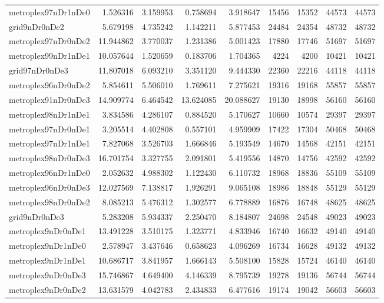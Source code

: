 \begin{longtable}{|l|r|r|r|r|r|r|r|r|}
metroplex97nDr1nDe0 & 1.526316 & 3.159953 & 0.758694 & 3.918647 & 15456 & 15352 & 44573 & 44573 \\
grid9nDr0nDe2 & 5.679198 & 4.735242 & 1.142211 & 5.877453 & 24484 & 24354 & 48732 & 48732 \\
metroplex97nDr0nDe2 & 11.944862 & 3.770037 & 1.231386 & 5.001423 & 17880 & 17746 & 51697 & 51697 \\
metroplex99nDr1nDe1 & 10.057644 & 1.520659 & 0.183706 & 1.704365 & 4224 & 4200 & 10421 & 10421 \\
grid97nDr0nDe3 & 11.807018 & 6.093210 & 3.351120 & 9.444330 & 22360 & 22216 & 44118 & 44118 \\
metroplex96nDr0nDe2 & 5.854611 & 5.506010 & 1.769611 & 7.275621 & 19316 & 19168 & 55857 & 55857 \\
metroplex91nDr0nDe3 & 14.909774 & 6.464542 & 13.624085 & 20.088627 & 19130 & 18998 & 56160 & 56160 \\
metroplex98nDr1nDe1 & 3.834586 & 4.286107 & 0.884520 & 5.170627 & 10660 & 10574 & 29397 & 29397 \\
metroplex97nDr0nDe1 & 3.205514 & 4.402808 & 0.557101 & 4.959909 & 17422 & 17304 & 50468 & 50468 \\
metroplex97nDr1nDe1 & 7.827068 & 3.526703 & 1.666846 & 5.193549 & 14670 & 14568 & 42151 & 42151 \\
metroplex98nDr0nDe3 & 16.701754 & 3.327755 & 2.091801 & 5.419556 & 14870 & 14756 & 42592 & 42592 \\
metroplex96nDr1nDe0 & 2.052632 & 4.988302 & 1.122430 & 6.110732 & 18968 & 18836 & 55109 & 55109 \\
metroplex96nDr0nDe3 & 12.027569 & 7.138817 & 1.926291 & 9.065108 & 18986 & 18848 & 55129 & 55129 \\
metroplex98nDr0nDe2 & 8.085213 & 5.476312 & 1.302577 & 6.778889 & 16876 & 16748 & 48625 & 48625 \\
grid9nDr0nDe3 & 5.283208 & 5.934337 & 2.250470 & 8.184807 & 24698 & 24548 & 49023 & 49023 \\
metroplex9nDr0nDe1 & 13.491228 & 3.510175 & 1.323771 & 4.833946 & 16740 & 16632 & 49140 & 49140 \\
metroplex9nDr1nDe0 & 2.578947 & 3.437646 & 0.658623 & 4.096269 & 16734 & 16628 & 49132 & 49132 \\
metroplex9nDr1nDe1 & 10.686717 & 3.841957 & 1.666143 & 5.508100 & 15828 & 15724 & 46140 & 46140 \\
metroplex9nDr0nDe3 & 15.746867 & 4.649400 & 4.146339 & 8.795739 & 19278 & 19136 & 56744 & 56744 \\
metroplex9nDr0nDe2 & 13.631579 & 4.042783 & 2.434833 & 6.477616 & 19174 & 19042 & 56603 & 56603 \\
\end{longtable}
